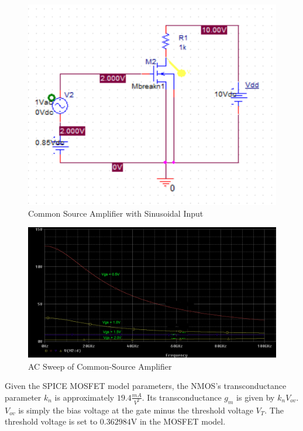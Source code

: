 \FloatBarrier

\begin{figure}[h!]
	\centering
	\includegraphics[scale=0.75]{./images/circuit2.PNG}
	\caption{Common Source Amplifier with Sinusoidal Input}
	\label{fig:circuit2}
\end{figure}

\FloatBarrier

\FloatBarrier

\begin{figure}[h!]
	\centering
	\includegraphics[scale=0.25]{./images/vout_vs_f.PNG}
	\caption{AC Sweep of Common-Source Amplifier}
	\label{fig:vout_vs_f}
\end{figure}

\FloatBarrier

Given the SPICE MOSFET model parameters, the NMOS's transconductance parameter $k_n$ is approximately $19.4 \frac{mA}{V^2}$. Its transconductance $g_m$ is given by $k_n V_{ov}$. $V_{ov}$ is simply the bias voltage at the gate minus the threshold voltage $V_T$. The threshold voltage is set to $0.362984$\si{\volt} in the MOSFET model.

